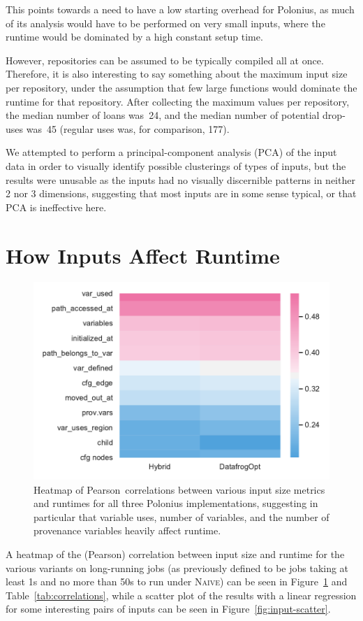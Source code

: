 \documentclass[11pt,a4paper,twoside,openany,draft]{report}
\begin{document}
This points towards a need to have a low starting overhead for Polonius, as
much of its analysis would have to be performed on very small inputs, where the
runtime would be dominated by a high constant setup time.

However, repositories can be assumed to be typically compiled all at once.
Therefore, it is also interesting to say something about the maximum input size
per repository, under the assumption that few large functions would dominate the
runtime for that repository. After collecting the maximum values per repository,
the median number of loans was~24, and the median number of potential drop-uses
was~45 (regular uses was, for comparison, 177).

We attempted to perform a principal-component analysis (PCA) of the input data
in order to visually identify possible clusterings of types of inputs, but the
results were unusable as the inputs had no visually discernible patterns in
neither 2 nor 3 dimensions, suggesting that most inputs are in some sense
typical, or that PCA is ineffective here.

\section{How Inputs Affect Runtime}\label{sec:inputs:correlation}
\begin{figure}
  \includegraphics[width=0.9\linewidth]{Graphs/corr_heatmap.pdf}
  \caption[Heatmap of Input Sizes Affecting Runtime]{Heatmap of
    Pearson~correlations between various input size metrics and runtimes for
    all three Polonius implementations, suggesting in particular that variable
    uses, number of variables, and the number of provenance variables heavily
    affect runtime.}\label{fig:corr-heatmap}
\end{figure}
A heatmap of the (Pearson) correlation between input size and runtime for the
various variants on long-running jobs (as previously defined to be jobs taking
at least 1s and no more than 50s to run under \textsc{Naive}) can be seen in
Figure~\ref{fig:corr-heatmap} and Table~\ref{tab:correlations}, while a scatter
plot of the results with a linear regression for some interesting pairs of
inputs can be seen in Figure~\ref{fig:input-scatter}.
\end{document}
